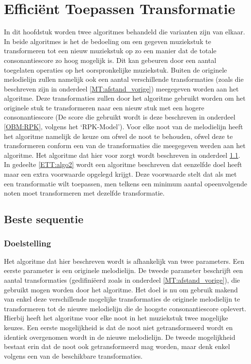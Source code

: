 \chapter{Effici\"ent Toepassen Transformatie}
\label{hoofdstuk:ETT}

In dit hoofdstuk worden twee algoritmes behandeld die varianten zijn van elkaar. In beide algoritmes is het de bedoeling om een gegeven muziekstuk te transformeren tot een nieuw muziekstuk op zo een manier dat de totale consonantiescore zo hoog mogelijk is. Dit kan gebeuren door een aantal toegelaten operaties op het oorspronkelijke muziekstuk. Buiten de originele melodielijn zullen namelijk ook een aantal verschillende transformaties (zoals die beschreven zijn in onderdeel \ref{MT:afstand_vorige}) meegegeven worden aan het algoritme. Deze transformaties zullen door het algoritme gebruikt worden om het originele stuk te transformeren naar een nieuw stuk met een hogere consonantiescore (De score die gebruikt wordt is deze beschreven in onderdeel \ref{OBM:RPK}, volgens het `RPK-Model'). Voor elke noot van de melodielijn heeft het algoritme namelijk de keuze om ofwel de noot te behouden, ofwel deze te transformeren conform een van de transformaties die meegegeven werden aan het algoritme. Het algoritme dat hier voor zorgt wordt beschreven in onderdeel \ref{ETT:algo1}. In gedeelte \ref{ETT:algo2} wordt een algoritme beschreven dat eenzelfde doel heeft maar een extra voorwaarde opgelegd krijgt. Deze voorwaarde stelt dat als met een transformatie wilt toepassen, men telkens een minimum aantal opeenvolgende noten moet transformeren met dezelfde transformatie. 

\section{Beste sequentie}
\label{ETT:algo1}

\subsection{Doelstelling}
Het algoritme dat hier beschreven wordt is afhankelijk van twee parameters. Een eerste parameter is een originele melodielijn. De tweede parameter beschrijft een aantal transformaties (gedifini\"eerd zoals in onderdeel \ref{MT:afstand_vorige}), die gebruikt mogen worden door het algoritme. Het doel is nu om gebruik makend van enkel deze verschillende mogelijke transformaties de originele melodielijn te transformeren tot de nieuwe melodielijn die de hoogste consonantiescore oplevert. Hierbij heeft het algoritme voor elke noot in het muziekstuk twee mogelijke keuzes. Een eerste mogelijkheid is dat de noot niet getransformeerd wordt en identiek overgenomen wordt in de nieuwe melodielijn. De tweede mogelijkheid bestaat erin dat de noot ook getransformeerd mag worden, maar denk enkel volgens een van de beschikbare transformaties.

